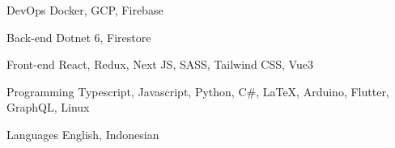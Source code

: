 

\begin{cvskills}

  \cvskill
    {DevOps} %
    {Docker, GCP, Firebase} %

  \cvskill
    {Back-end} %
    {Dotnet 6, Firestore} %

  \cvskill
    {Front-end} %
    { React, Redux, Next JS, SASS, Tailwind CSS, Vue3} %

  \cvskill
    {Programming} %
    {Typescript, Javascript, Python, C\#, LaTeX, Arduino, Flutter, GraphQL, Linux} %

  \cvskill
    {Languages} %
    {English, Indonesian} %

\end{cvskills}

